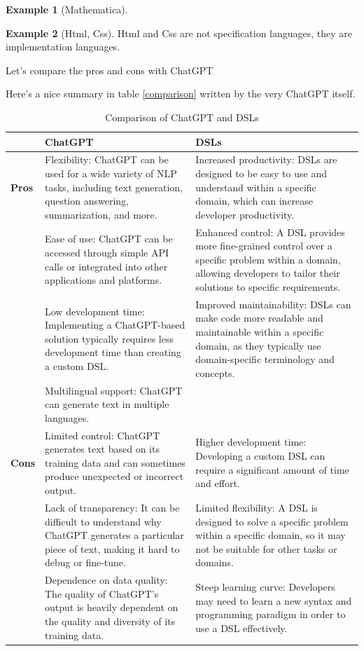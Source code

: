 \documentclass[11pt, oneside]{article}   	%
\theoremstyle{definition}
\newtheorem*{eg}{Example}
\begin{document}
\begin{eg}
	[Mathematica]
\end{eg}

\begin{eg}
	[Html, Css] Html and Css are not specification languages, they are implementation languages.
\end{eg}

Let's compare the pros and cons with ChatGPT

Here's a nice summary in table \ref{comparison} written by the very ChatGPT itself.

\begin{table}[ht]
\label{comparison}
\centering
\small %
\begin{tabular}{|l|p{6cm}|p{6cm}|}
\hline
 & \textbf{ChatGPT} & \textbf{DSLs} \\
\hline
\textbf{Pros} & 
Flexibility: ChatGPT can be used for a wide variety of NLP tasks, including text generation, question answering, summarization, and more.
&
Increased productivity: DSLs are designed to be easy to use and understand within a specific domain, which can increase developer productivity. \\
\cline{2-3}
& 
Ease of use: ChatGPT can be accessed through simple API calls or integrated into other applications and platforms.
&
Enhanced control: A DSL provides more fine-grained control over a specific problem within a domain, allowing developers to tailor their solutions to specific requirements. \\
\cline{2-3}
& 
Low development time: Implementing a ChatGPT-based solution typically requires less development time than creating a custom DSL.
&
Improved maintainability: DSLs can make code more readable and maintainable within a specific domain, as they typically use domain-specific terminology and concepts. \\
\cline{2-3}
& 
Multilingual support: ChatGPT can generate text in multiple languages.
&
 \\
\hline
\textbf{Cons} & 
Limited control: ChatGPT generates text based on its training data and can sometimes produce unexpected or incorrect output.
&
Higher development time: Developing a custom DSL can require a significant amount of time and effort. \\
\cline{2-3}
& 
Lack of transparency: It can be difficult to understand why ChatGPT generates a particular piece of text, making it hard to debug or fine-tune.
&
Limited flexibility: A DSL is designed to solve a specific problem within a specific domain, so it may not be suitable for other tasks or domains. \\
\cline{2-3}
& 
Dependence on data quality: The quality of ChatGPT's output is heavily dependent on the quality and diversity of its training data.
&
Steep learning curve: Developers may need to learn a new syntax and programming paradigm in order to use a DSL effectively. \\
\hline
\end{tabular}
\caption{Comparison of ChatGPT and DSLs}
\label{tab:chatgpt-dsls}
\end{table}
\end{document}
